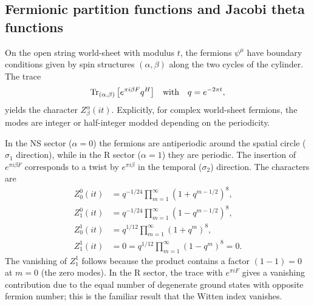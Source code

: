 \documentclass[11pt,a4paper]{article}
\begin{document}
\subsection{Fermionic partition functions and Jacobi theta functions}
On the open string world-sheet with modulus $t$, the fermions $\psi^\mu$ have boundary conditions given by spin structures $(\alpha,\beta)$ along the two cycles of the cylinder. The trace
\begin{equation}
\Tr_{(\alpha,\beta)} \big[ e^{\pi i \beta F} q^{H} \big] \quad \text{with} \quad q = e^{-2\pi t},
\end{equation}
yields the character $Z^\alpha_\beta(it)$. Explicitly, for complex world-sheet fermions, the modes are integer or half-integer modded depending on the periodicity.

In the NS sector ($\alpha=0$) the fermions are antiperiodic around the spatial circle ($\sigma_1$ direction), while in the R sector ($\alpha=1$) they are periodic. The insertion of $e^{\pi i \beta F}$ corresponds to a twist by $e^{\pi i \beta}$ in the temporal ($\sigma_2$) direction. The characters are
\begin{align}
Z^0_0(it) &= q^{-1/24} \prod_{m=1}^\infty (1 + q^{m-1/2})^8, \label{Z00}\\
Z^0_1(it) &= q^{-1/24} \prod_{m=1}^\infty (1 - q^{m-1/2})^8, \\
Z^1_0(it) &= q^{1/12} \prod_{m=1}^\infty (1 + q^{m})^8, \label{Z10}\\
Z^1_1(it) &= 0 = q^{1/12} \prod_{m=1}^\infty (1 - q^{m})^8 = 0.
\end{align}
The vanishing of $Z^1_1$ follows because the product contains a factor $(1-1)=0$ at $m=0$ (the zero modes). In the R sector, the trace with $e^{\pi i F}$ gives a vanishing contribution due to the equal number of degenerate ground states with opposite fermion number; this is the familiar result that the Witten index vanishes.
\end{document}
